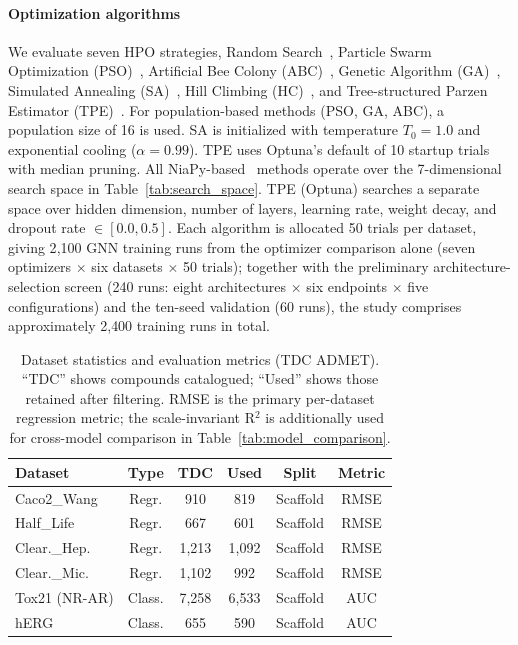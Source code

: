 \documentclass[journal]{IEEEtran}
\begin{document}
\paragraph{Optimization algorithms}
We evaluate seven HPO strategies, Random Search~\cite{bergstra2012random}, Particle Swarm Optimization (PSO)~\cite{kennedy1995pso}, Artificial Bee Colony (ABC)~\cite{karaboga2005abc}, Genetic Algorithm (GA)~\cite{holland1975ga}, Simulated Annealing (SA)~\cite{saopt}, Hill Climbing (HC)~\cite{russell2010aima}, and Tree-structured Parzen Estimator (TPE)~\cite{akiba2019optuna}. For population-based methods (PSO, GA, ABC), a population size of 16 is used. SA is initialized with temperature $T_0 = 1.0$ and exponential cooling ($\alpha = 0.99$). TPE uses Optuna's default of 10 startup trials with median pruning. All NiaPy-based~\cite{niapy} methods operate over the 7-dimensional search space in Table~\ref{tab:search_space}. TPE (Optuna) searches a separate space over hidden dimension, number of layers, learning rate, weight decay, and dropout rate $\in [0.0, 0.5]$. Each algorithm is allocated 50 trials per dataset, giving 2{,}100 GNN training runs from the optimizer comparison alone (seven optimizers $\times$ six datasets $\times$ 50 trials); together with the preliminary architecture-selection screen (240 runs: eight architectures $\times$ six endpoints $\times$ five configurations) and the ten-seed validation (60 runs), the study comprises approximately 2{,}400 training runs in total.

\begin{table}[!t]
\centering
\caption{Dataset statistics and evaluation metrics (TDC ADMET). ``TDC'' shows compounds catalogued; ``Used'' shows those retained after filtering. RMSE is the primary per-dataset regression metric; the scale-invariant R$^2$ is additionally used for cross-model comparison in Table~\ref{tab:model_comparison}.}
\label{tab:dataset_stats}
\small
\begin{tabular}{lccccc}
\toprule
\textbf{Dataset} & \textbf{Type} & \textbf{TDC} & \textbf{Used} & \textbf{Split} & \textbf{Metric} \\
\midrule
Caco2\_Wang & Regr. & 910 & 819 & Scaffold & RMSE \\
Half\_Life & Regr. & 667 & 601 & Scaffold & RMSE \\
Clear.\_Hep. & Regr. & 1,213 & 1,092 & Scaffold & RMSE \\
Clear.\_Mic. & Regr. & 1,102 & 992 & Scaffold & RMSE \\
Tox21 (NR-AR) & Class. & 7,258 & 6,533 & Scaffold & AUC \\
hERG & Class. & 655 & 590 & Scaffold & AUC \\
\bottomrule
\end{tabular}
\end{table}
\end{document}
